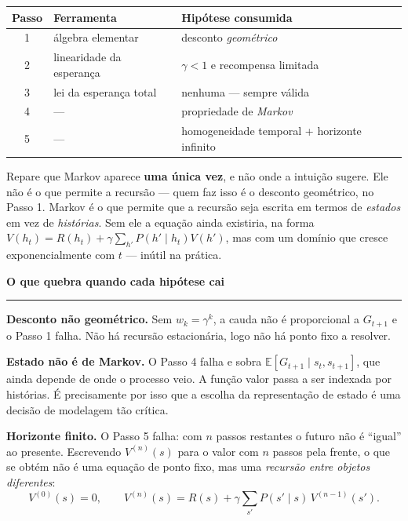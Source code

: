 \documentclass[10pt, a4paper]{article}
\newcounter{secao}
\newcommand{\secao}[1]{%
  \vspace{0.8em}%
  \stepcounter{secao}%
  \noindent{\color{rlLaranja}\rule{1.6em}{2pt}}\hspace{0.5em}%
  {\color{rlCinza}\footnotesize\bfseries\thesecao}\hspace{0.35em}%
  {\color{rlAzul}\large\bfseries #1}%
  \par\vspace{-0.15em}%
  {\color{rlAzul!22}\rule{\linewidth}{0.6pt}}%
  \par\vspace{0.3em}}
\newcounter{passo}
\newcommand{\E}{\mathbb{E}}
\newcommand{\tran}[2]{P(#1\mid #2)}
\newcommand{\rec}{R}
\begin{document}
\begin{center}
\footnotesize
\setlength{\tabcolsep}{6pt}
\renewcommand{\arraystretch}{1.22}
\begin{tabular}{@{}c l l@{}}
  \toprule
  \textbf{Passo} & \textbf{Ferramenta} & \textbf{Hipótese consumida} \\
  \midrule
  1 & álgebra elementar        & desconto \emph{geométrico} \\
  2 & linearidade da esperança & $\gamma<1$ e recompensa limitada \\
  3 & lei da esperança total   & \textcolor{rlCinza}{nenhuma — sempre válida} \\
  4 & ---                      & propriedade de \emph{Markov} \\
  5 & ---                      & homogeneidade temporal + horizonte infinito \\
  \bottomrule
\end{tabular}
\end{center}

\begin{ideiabox}
Repare que Markov aparece \textbf{uma única vez}, e não onde a intuição sugere.
Ele não é o que permite a recursão — quem faz isso é o desconto geométrico, no
Passo 1. Markov é o que permite que a recursão seja escrita em termos de
\emph{estados} em vez de \emph{histórias}. Sem ele a equação ainda existiria,
na forma $V(h_t) = \rec(h_t) + \gamma\sum_{h'} P(h'\mid h_t) V(h')$, mas com um
domínio que cresce exponencialmente com $t$ — inútil na prática.
\end{ideiabox}

\secao{O que quebra quando cada hipótese cai}

\textbf{Desconto não geométrico.} Sem $w_k = \gamma^k$, a cauda não é
proporcional a $G_{t+1}$ e o Passo 1 falha. Não há recursão estacionária, logo
não há ponto fixo a resolver.

\textbf{Estado não é de Markov.} O Passo 4 falha e sobra
$\E[G_{t+1}\mid s_t, s_{t+1}]$, que ainda depende de onde o processo veio.
A função valor passa a ser indexada por histórias. É precisamente por isso que
a escolha da representação de estado é uma decisão de modelagem tão crítica.

\textbf{Horizonte finito.} O Passo 5 falha: com $n$ passos restantes o futuro
não é ``igual'' ao presente. Escrevendo $V^{(n)}(s)$ para o valor com $n$ passos
pela frente, o que se obtém não é uma equação de ponto fixo, mas uma
\emph{recursão entre objetos diferentes}:
\[
  V^{(0)}(s) = 0,
  \qquad
  V^{(n)}(s) = \rec(s) + \gamma \sum_{s'} \tran{s'}{s}\, V^{(n-1)}(s').
\]
\end{document}
